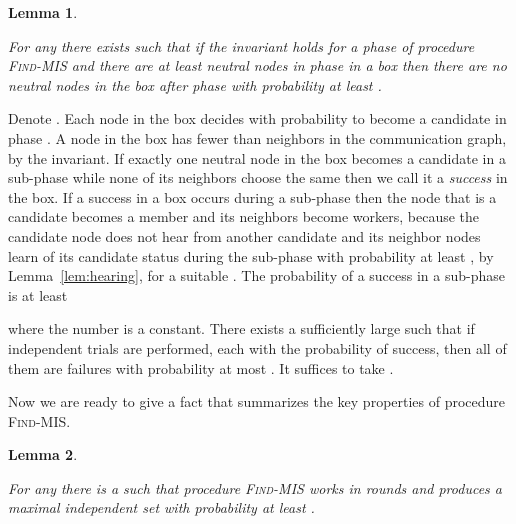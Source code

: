 \documentclass[11pt]{article}
\newcommand{\qed}{\hfill  \smallskip}
\newenvironment{proof}{\noindent{\bf Proof:}}{\qed}
\newtheorem{lemma}{Lemma}
\begin{document}
\begin{lemma}
\label{lem:neutral-in-box}

For any  there exists  such that if the invariant holds for a phase  of procedure \textsc{Find-MIS} and there are at least  neutral nodes in phase  in a box then there are no neutral nodes in the box after phase   with probability at least .
\end{lemma}


\begin{proof}
Denote .
Each node in the box decides with probability  to become a candidate in phase .
A node in the box has fewer than  neighbors in the communication graph, by the invariant.
If exactly one neutral node in the box becomes a candidate in a sub-phase while none of its neighbors choose the same then we call it a \emph{success} in the box. 
If a success in a box occurs during a sub-phase then the node that is a candidate becomes a member and its neighbors become workers, because the candidate node does not hear from another candidate and its neighbor nodes learn of its candidate status during the sub-phase with probability at least , by Lemma~\ref{lem:hearing}, for a suitable .
The probability of a success in a sub-phase is at least

where the number  is a constant.
There exists a sufficiently large  such that if  independent trials  are performed,  each with the probability  of success, then all of them are failures with probability at most .
It suffices to take .
\end{proof}


Now we are ready to give a fact that summarizes the key properties of procedure \textsc{Find-MIS}.



\begin{lemma}
\label{lem:MIS}

For any  there is a  such that procedure \textsc{Find-MIS} works in  rounds and produces a maximal independent set with probability at least .
\end{lemma}
\end{document}

